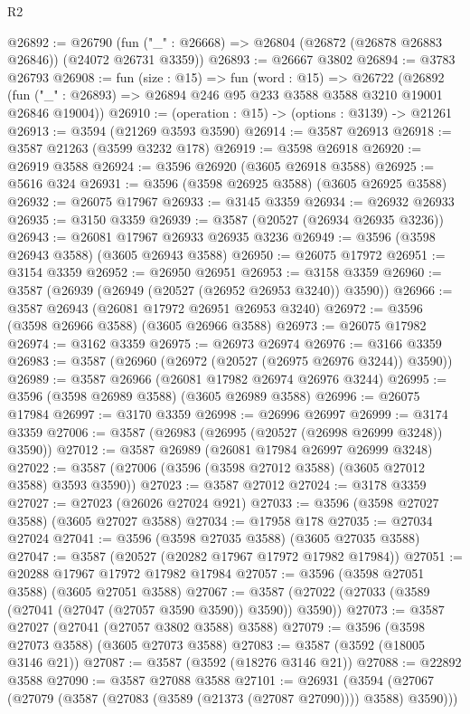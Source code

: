 \begin{lexlean}{R2}
\begin{coremodule}
@26892 := @26790
    (fun ("_" : @26668) => @26804 (@26872 (@26878 @26883 @26846)) (@24072 @26731 @3359))
@26893 := @26667 @3802
@26894 := @3783 @26793
@26908 := fun (size : @15) =>
  fun (word : @15) =>
  @26722
    (@26892 (fun ("_" : @26893) => @26894 @246 @95 @233 @3588 @3588 @3210 @19001 @26846 @19004))
@26910 := (operation : @15) -> (options : @3139) -> @21261
@26913 := @3594 (@21269 @3593 @3590)
@26914 := @3587 @26913
@26918 := @3587 @21263 (@3599 @3232 @178)
@26919 := @3598 @26918
@26920 := @26919 @3588
@26924 := @3596 @26920 (@3605 @26918 @3588)
@26925 := @5616 @324
@26931 := @3596 (@3598 @26925 @3588) (@3605 @26925 @3588)
@26932 := @26075 @17967
@26933 := @3145 @3359
@26934 := @26932 @26933
@26935 := @3150 @3359
@26939 := @3587 (@20527 (@26934 @26935 @3236))
@26943 := @26081 @17967 @26933 @26935 @3236
@26949 := @3596 (@3598 @26943 @3588) (@3605 @26943 @3588)
@26950 := @26075 @17972
@26951 := @3154 @3359
@26952 := @26950 @26951
@26953 := @3158 @3359
@26960 := @3587 (@26939 (@26949 (@20527 (@26952 @26953 @3240)) @3590))
@26966 := @3587 @26943 (@26081 @17972 @26951 @26953 @3240)
@26972 := @3596 (@3598 @26966 @3588) (@3605 @26966 @3588)
@26973 := @26075 @17982
@26974 := @3162 @3359
@26975 := @26973 @26974
@26976 := @3166 @3359
@26983 := @3587 (@26960 (@26972 (@20527 (@26975 @26976 @3244)) @3590))
@26989 := @3587 @26966 (@26081 @17982 @26974 @26976 @3244)
@26995 := @3596 (@3598 @26989 @3588) (@3605 @26989 @3588)
@26996 := @26075 @17984
@26997 := @3170 @3359
@26998 := @26996 @26997
@26999 := @3174 @3359
@27006 := @3587 (@26983 (@26995 (@20527 (@26998 @26999 @3248)) @3590))
@27012 := @3587 @26989 (@26081 @17984 @26997 @26999 @3248)
@27022 := @3587 (@27006 (@3596 (@3598 @27012 @3588) (@3605 @27012 @3588) @3593 @3590))
@27023 := @3587 @27012
@27024 := @3178 @3359
@27027 := @27023 (@26026 @27024 @921)
@27033 := @3596 (@3598 @27027 @3588) (@3605 @27027 @3588)
@27034 := @17958 @178
@27035 := @27034 @27024
@27041 := @3596 (@3598 @27035 @3588) (@3605 @27035 @3588)
@27047 := @3587 (@20527 (@20282 @17967 @17972 @17982 @17984))
@27051 := @20288 @17967 @17972 @17982 @17984
@27057 := @3596 (@3598 @27051 @3588) (@3605 @27051 @3588)
@27067 := @3587 (@27022 (@27033 (@3589 (@27041 (@27047 (@27057 @3590 @3590)) @3590)) @3590))
@27073 := @3587 @27027 (@27041 (@27057 @3802 @3588) @3588)
@27079 := @3596 (@3598 @27073 @3588) (@3605 @27073 @3588)
@27083 := @3587 (@3592 (@18005 @3146 @21))
@27087 := @3587 (@3592 (@18276 @3146 @21))
@27088 := @22892 @3588
@27090 := @3587 @27088 @3588
@27101 := @26931
    (@3594 (@27067 (@27079 (@3587 (@27083 (@3589 (@21373 (@27087 @27090)))) @3588) @3590)))

\end{coremodule}
\end{lexlean}
